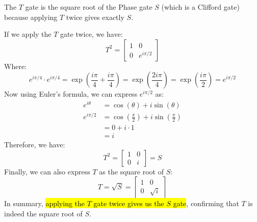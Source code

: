 \highspace
\begin{deepeningbox}
    The $T$ gate is the square root of the Phase gate $S$ (which is a Clifford gate) because applying $T$ twice gives exactly $S$.

    \highspace
    If we apply the $T$ gate twice, we have:
    \begin{equation*}
        T^2 =
        \begin{bmatrix}
            1 & 0 \\
            0 & e^{i\pi/2}
        \end{bmatrix}
    \end{equation*}
    Where:
    \begin{equation*}
        e^{i\pi/4} \cdot e^{i\pi/4} = \exp\left(
            \frac{i\pi}{4} + \frac{i\pi}{4}
        \right) = 
        \exp\left(
            \frac{2 i\pi}{4}
        \right) =
        \exp\left(
            \frac{i\pi}{2}
        \right) =
        e^{i\pi/2}
    \end{equation*}
    Now using Euler's formula, we can express $e^{i\pi/2}$ as:
    \begin{equation*}
        \begin{aligned}
            e^{i\theta} &= \cos\left(\theta\right) + i \sin\left(\theta\right) \\
            e^{i\pi/2} &= \cos\left(\frac{\pi}{2}\right) + i \sin\left(\frac{\pi}{2}\right) \\
            &= 0 + i \cdot 1 \\
            &= i
        \end{aligned}
    \end{equation*}
    Therefore, we have:
    \begin{equation*}
        T^2 =
        \begin{bmatrix}
            1 & 0 \\
            0 & i
        \end{bmatrix} =
        S
    \end{equation*}
    Finally, we can also express $T$ as the square root of $S$:
    \begin{equation*}
        T =
        \sqrt{S} =
        \begin{bmatrix}
            1 & 0 \\
            0 & \sqrt{i}
        \end{bmatrix}
    \end{equation*}
    In summary, \hl{applying the $T$ gate twice gives us the $S$ gate}, confirming that $T$ is indeed the square root of $S$.
\end{deepeningbox}

